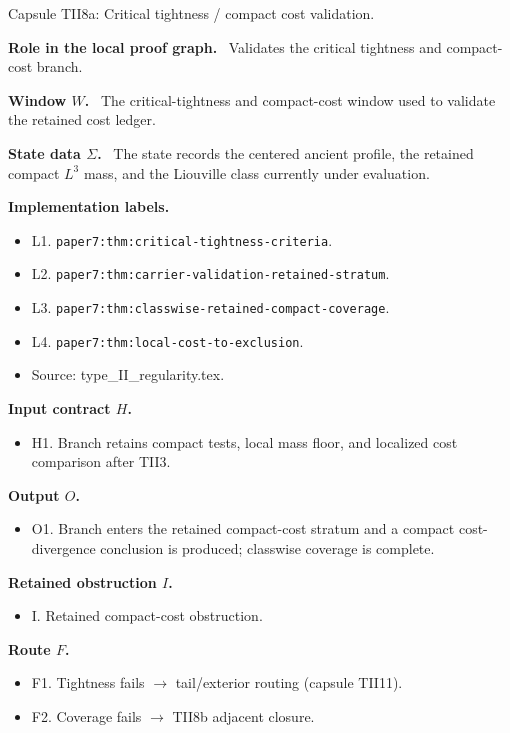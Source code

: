 \documentclass[11pt]{amsart}
\newcommand{\capsulefield}[1]{\par\smallskip\noindent\textbf{#1.}\ }
\begin{document}
\begin{proofcapsule}{Capsule TII8a: Critical tightness / compact cost validation.}
  \capsulefield{Role in the local proof graph}
  Validates the critical tightness and compact-cost branch.

  \capsulefield{Window \(W\)}
The critical-tightness and compact-cost window used to validate the retained cost ledger.

  \capsulefield{State data \(\Sigma\)}
The state records the centered ancient profile, the retained compact $L^3$ mass, and the Liouville class currently under evaluation.

  \capsulefield{Implementation labels}
  \begin{itemize}[leftmargin=1.8em]
  \item L1. \texttt{paper7:thm:critical-tightness-criteria}.
  \item L2. \texttt{paper7:thm:carrier-validation-retained-stratum}.
  \item L3. \texttt{paper7:thm:classwise-retained-compact-coverage}.
  \item L4. \texttt{paper7:thm:local-cost-to-exclusion}.
  \item Source: type\_II\_regularity.tex.
  \end{itemize}

  \capsulefield{Input contract \(H\)}
  \begin{itemize}[leftmargin=1.8em]
  \item H1. Branch retains compact tests, local mass floor, and localized cost comparison after TII3.
  \end{itemize}

  \capsulefield{Output \(O\)}
  \begin{itemize}[leftmargin=1.8em]
  \item O1. Branch enters the retained compact-cost stratum and a compact cost- divergence conclusion is produced; classwise coverage is complete.
  \end{itemize}

  \capsulefield{Retained obstruction \(I\)}
  \begin{itemize}[leftmargin=1.8em]
  \item I. Retained compact-cost obstruction.
  \end{itemize}

  \capsulefield{Route \(F\)}
  \begin{itemize}[leftmargin=1.8em]
  \item F1. Tightness fails $\to$ tail/exterior routing (capsule TII11).
  \item F2. Coverage fails $\to$ TII8b adjacent closure.
  \end{itemize}


\end{proofcapsule}
\end{document}
